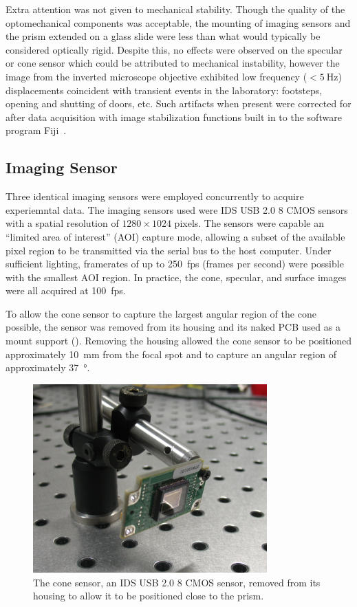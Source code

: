 Extra attention was not given to mechanical stability.  Though the quality of
the optomechanical components was acceptable, the mounting of imaging sensors
and the prism extended on a glass slide were less than what would
typically be considered optically rigid.  Despite this, no effects were
observed on the specular or cone sensor which could be attributed to
mechanical instability, however the image from the inverted microscope
objective exhibited low frequency ($<\SI{5}{\hertz}$) displacements coincident
with transient events in the laboratory: footsteps, opening and shutting of
doors, etc.  Such artifacts when present were corrected for after data
acquisition with image stabilization functions built in to the software
program Fiji~\cite{schindelin2012fiji}.

\subsection{Imaging Sensor}
Three identical imaging sensors were employed concurrently to acquire
experiemntal data.  The imaging sensors used were IDS USB 2.0 \SI{8}{\bit}
CMOS sensors with a spatial resolution of $1280\times1024$ pixels.  The
sensors were capable an ``limited area of interest'' (AOI) capture mode,
allowing a subset of the available pixel region to be transmitted via the
serial bus to the host computer.  Under sufficient lighting, framerates of
up to \SI{250}{fps} (frames per second) were possible with the smallest AOI
region.  In practice, the cone, specular, and surface images were all
acquired at \SI{100}{fps}.

To allow the cone sensor to capture the largest angular region of the cone
possible, the sensor was removed from its housing and its naked PCB used as
a mount support ().  Removing the housing allowed
the cone sensor to be positioned approximately \SI{10}{\milli\meter} from
the focal spot and to capture an angular region of approximately
\SI{37}{\degree}.
\begin{figure}[ht]
 \centering
 \includegraphics[width=9cm,keepaspectratio]{experimental/figures/nakedsensorcrop.jpg}
\caption{The cone sensor, an IDS USB 2.0 \SI{8}{\bit} CMOS sensor, removed from its housing to allow it to be positioned close to the prism.}
\label{fig:imagingsensor}
\end{figure}

